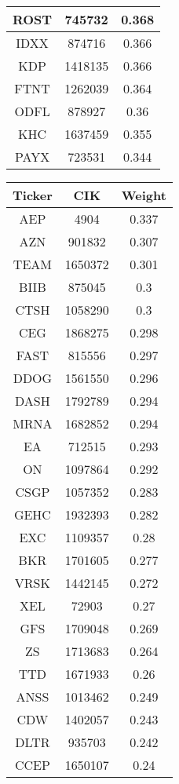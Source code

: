 \documentclass[logo,bsc,singlespacing,parskip]{infthesis}
\begin{document}
\begin{longtable}
\begin{tabular}[t]{|c|c|c|}
ROST & 745732 & 0.368 \\ \hline
IDXX & 874716 & 0.366 \\ \hline
KDP & 1418135 & 0.366 \\ \hline
FTNT & 1262039 & 0.364 \\ \hline
ODFL & 878927 & 0.36 \\ \hline
KHC & 1637459 & 0.355 \\ \hline
PAYX & 723531 & 0.344 \\ \hline
                \end{tabular}
                \hfill
                \begin{tabular}[t]{|c|c|c|}
                    \hline
                    \textbf{Ticker} & \textbf{CIK} & \textbf{Weight} \\ \hline
AEP & 4904 & 0.337 \\ \hline
AZN & 901832 & 0.307 \\ \hline
TEAM & 1650372 & 0.301 \\ \hline
BIIB & 875045 & 0.3 \\ \hline
CTSH & 1058290 & 0.3 \\ \hline
CEG & 1868275 & 0.298 \\ \hline
FAST & 815556 & 0.297 \\ \hline
DDOG & 1561550 & 0.296 \\ \hline
DASH & 1792789 & 0.294 \\ \hline
MRNA & 1682852 & 0.294 \\ \hline
EA & 712515 & 0.293 \\ \hline
ON & 1097864 & 0.292 \\ \hline
CSGP & 1057352 & 0.283 \\ \hline
GEHC & 1932393 & 0.282 \\ \hline
EXC & 1109357 & 0.28 \\ \hline
BKR & 1701605 & 0.277 \\ \hline
VRSK & 1442145 & 0.272 \\ \hline
XEL & 72903 & 0.27 \\ \hline
GFS & 1709048 & 0.269 \\ \hline
ZS & 1713683 & 0.264 \\ \hline
TTD & 1671933 & 0.26 \\ \hline
ANSS & 1013462 & 0.249 \\ \hline
CDW & 1402057 & 0.243 \\ \hline
DLTR & 935703 & 0.242 \\ \hline
CCEP & 1650107 & 0.24 \\ \hline

\end{tabular}
\end{longtable}
\end{document}
